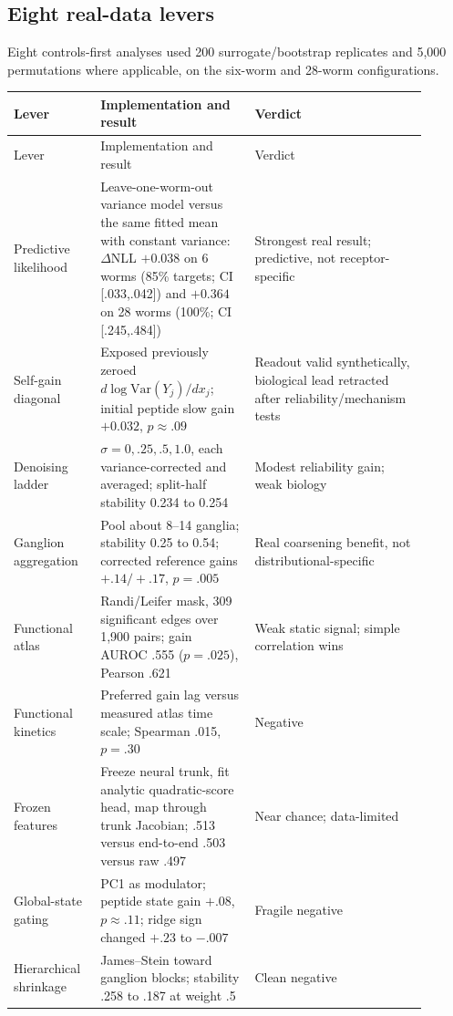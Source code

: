 \documentclass[10pt]{article}
\begin{document}
\subsection{Eight real-data levers}

Eight controls-first analyses used 200 surrogate/bootstrap replicates and 5,000 permutations where applicable, on the six-worm and 28-worm configurations.

\begin{longtable}{L{0.18\linewidth}L{0.34\linewidth}L{0.38\linewidth}}
\toprule
Lever & Implementation and result & Verdict \\
\midrule
\endfirsthead
\toprule Lever & Implementation and result & Verdict \\
\midrule\endhead
Predictive likelihood & Leave-one-worm-out variance model versus the same fitted mean with constant variance: $\Delta$NLL $+0.038$ on 6 worms (85\% targets; CI [.033,.042]) and $+0.364$ on 28 worms (100\%; CI [.245,.484]) & Strongest real result; predictive, not receptor-specific \\
Self-gain diagonal & Exposed previously zeroed $d\log\mathrm{Var}(Y_j)/dx_j$; initial peptide slow gain $+0.032$, $p\approx.09$ & Readout valid synthetically, biological lead retracted after reliability/mechanism tests \\
Denoising ladder & $\sigma=0,.25,.5,1.0$, each variance-corrected and averaged; split-half stability 0.234 to 0.254 & Modest reliability gain; weak biology \\
Ganglion aggregation & Pool about 8--14 ganglia; stability 0.25 to 0.54; corrected reference gains $+.14/+.17$, $p=.005$ & Real coarsening benefit, not distributional-specific \\
Functional atlas & Randi/Leifer mask, 309 significant edges over 1,900 pairs; gain AUROC .555 ($p=.025$), Pearson .621 & Weak static signal; simple correlation wins \\
Functional kinetics & Preferred gain lag versus measured atlas time scale; Spearman .015, $p=.30$ & Negative \\
Frozen features & Freeze neural trunk, fit analytic quadratic-score head, map through trunk Jacobian; .513 versus end-to-end .503 versus raw .497 & Near chance; data-limited \\
Global-state gating & PC1 as modulator; peptide state gain $+.08$, $p\approx.11$; ridge sign changed $+.23$ to $-.007$ & Fragile negative \\
Hierarchical shrinkage & James--Stein toward ganglion blocks; stability .258 to .187 at weight .5 & Clean negative \\
\bottomrule
\end{longtable}
\end{document}
